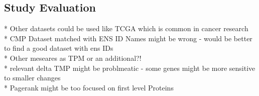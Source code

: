 \subsection{Study Evaluation} \label{subsec:evaluation}

{\color{lightgray}
* Other datasets could be used like TCGA which is common in cancer research \\
* CMP Dataset matched with ENS ID Names might be wrong - would be better to find a good dataset with ens IDs \\
* Other meseares as TPM or an additional?! \\
* relevant delta TMP might be problmeatic - some genes might be more sensitive to smaller changes \\
* Pagerank might be too focused on first level Proteins \\
}
